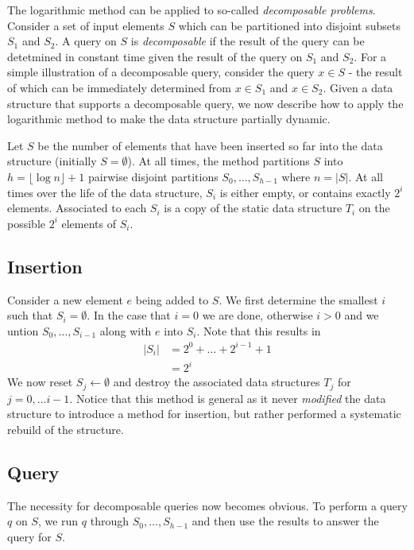 The logarithmic method can be applied to so-called \textit{decomposable problems}. Consider a set of input elements $S$ which can be partitioned into disjoint subsets $S_1$ and $S_2$. A query on $S$ is \textit{decomposable} if the result of the query can be detetmined in constant time given the result of the query on $S_1$ and $S_2$. For a simple illustration of a decomposable query, consider the query $x\in S$ - the result of which can be immediately determined from $x\in S_1$ and $x\in S_2$. Given a data structure that supports a decomposable query, we now describe how to apply the logarithmic method to make the data structure partially dynamic. 

Let $S$ be the number of elements that have been inserted so far into the data structure (initially $S=\emptyset$). At all times, the method partitions $S$ into $h = \lfloor\log n \rfloor+1$ pairwise disjoint partitions $S_0, \dots, S_{h-1}$ where $n = |S|$. At all times over the life of the data structure, $S_i$ is either empty, or contains exactly $2^i$ elements. Associated to each $S_i$ is a copy of the static data structure $T_i$ on the possible $2^i$ elements of $S_i$.

\subsection{Insertion}
\label{ssec:logarithmic-rebuilding-insertion}

Consider a new element $e$ being added to $S$. We first determine the smallest $i$ such that $S_i = \emptyset$. In the case that $i=0$ we are done, otherwise $i>0$ and we untion $S_0,\dots,S_{i-1}$ along with $e$ into $S_i$. Note that this results in 
\begin{align*}
    |S_i| &= 2^0 + \dots + 2^{i-1} + 1 \\
          &= 2^i
\end{align*}
We now reset $S_j \leftarrow \emptyset$  and destroy the associated data structures $T_j$ for $j=0,\dots i-1$. Notice that this
method is general as it never \textit{modified} the data structure to introduce a method for insertion, but rather performed a systematic rebuild of the structure.

\subsection{Query}
\label{ssec:logarithmic-rebuilding-query}

The necessity for decomposable queries now becomes obvious. To perform a query $q$ on $S$, we run $q$ through $S_0, \dots, S_{h-1}$ and then use the results to answer the query for $S$.

